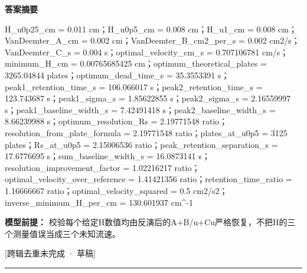 \documentclass[UTF8,11pt,a4paper]{ctexart}
\begin{document}
\noindent\textbf{答案摘要}\par
H\_u0p25\_cm = 0.011 cm；H\_u0p5\_cm = 0.008 cm；H\_u1\_cm = 0.008 cm；VanDeemter\_A\_cm = 0.002 cm；VanDeemter\_B\_cm2\_per\_s = 0.002 cm2/s；VanDeemter\_C\_s = 0.004 s；optimal\_velocity\_cm\_s = 0.707106781 cm/s；minimum\_H\_cm = 0.00765685425 cm；optimum\_theoretical\_plates = 3265.04844 plates；optimum\_dead\_time\_s = 35.3553391 s；peak1\_retention\_time\_s = 106.066017 s；peak2\_retention\_time\_s = 123.743687 s；peak1\_sigma\_s = 1.85622855 s；peak2\_sigma\_s = 2.16559997 s；peak1\_baseline\_width\_s = 7.42491418 s；peak2\_baseline\_width\_s = 8.66239988 s；optimum\_resolution\_Rs = 2.19771548 ratio；resolution\_from\_plate\_formula = 2.19771548 ratio；plates\_at\_u0p5 = 3125 plates；Rs\_at\_u0p5 = 2.15006536 ratio；peak\_retention\_separation\_s = 17.6776695 s；sum\_baseline\_width\_s = 16.0873141 s；resolution\_improvement\_factor = 1.02216217 ratio；optimal\_velocity\_over\_reference = 1.41421356 ratio；retention\_time\_ratio = 1.16666667 ratio；optimal\_velocity\_squared = 0.5 cm2/s2；inverse\_minimum\_H\_per\_cm = 130.601937 cm\textasciicircum{}-1\par
\noindent\textbf{模型前提：}
校验每个给定H数值均由反演后的A+B/u+Cu严格恢复，不把H的三个测量值误当成三个未知流速。\par
\noindent\textcolor{red!65!black}{[跨辑去重未完成 · 草稿]} \par
\medskip\hrule\medskip
{}
\end{document}
